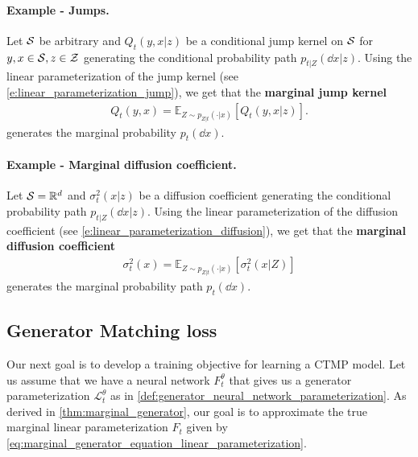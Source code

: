 \documentclass{fairmeta}
\newcommand{\highlight}[1]{{\color{metablue} \textbf{#1}}}
\numberwithin{equation}{section}
\begin{document}
\paragraph{Example - Jumps.} Let ${\mathcal{S}}$ be arbitrary and $Q_t(y,x|z)$  be a conditional jump kernel on ${\mathcal{S}}$ for $y,x\in {\mathcal{S}}, z\in{\mathcal{Z}}$ generating the conditional probability path $p_{t|Z}(\dd x|z)$. Using the linear parameterization of the jump kernel (see \cref{e:linear_parameterization_jump}), we get that the \highlight{marginal jump kernel}
\begin{align*}
Q_t(y,x)=\mathbb{E}_{Z\sim p_{Z|t}(\cdot|x)}[Q_t(y,x|z)].
\end{align*}
generates the marginal probability $p_t(\dd x)$.

\paragraph{Example - Marginal diffusion coefficient.} Let ${\mathcal{S}}=\mathbb{R}^d$ and $\sigma_t^2(x|z)$ be a diffusion coefficient generating the conditional probability path $p_{t|Z}(\dd x|z)$. Using the linear parameterization of the diffusion coefficient (see \cref{e:linear_parameterization_diffusion}), we get that the \highlight{marginal diffusion coefficient}
\begin{align*}
\sigma_t^2(x)=\mathbb{E}_{Z\sim p_{Z|t}(\cdot|x)}[\sigma_t^2(x|Z)]
\end{align*} 
generates the marginal probability path $p_t(\dd x)$.






\subsection{Generator Matching loss}
Our next goal is to develop a training objective for learning a CTMP model. Let us assume that we have a neural network $F_t^\theta$ that gives us a generator parameterization $\mathcal{L}_t^\theta$ as in \cref{def:generator_neural_network_parameterization}. As derived in \cref{thm:marginal_generator}, our goal is to approximate the true marginal linear parameterization $F_t$ given by \cref{eq:marginal_generator_equation_linear_parameterization}. 
\end{document}
